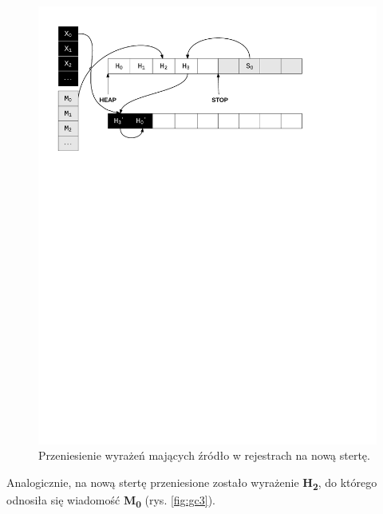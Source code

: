 \begin{figure}[h]
\centerline{\includegraphics[scale=0.75, clip, trim=10mm 185mm 45mm 10mm]{gc_2}}
\caption{Przeniesienie wyrażeń mających źródło w rejestrach na nową stertę.}
\label{fig:gc2}
\end{figure}

Analogicznie, na nową stertę przeniesione zostało wyrażenie \textbf{H\textsubscript{2}}, do którego odnosiła się wiadomość \textbf{M\textsubscript{0}} (rys. \ref{fig:gc3}).

